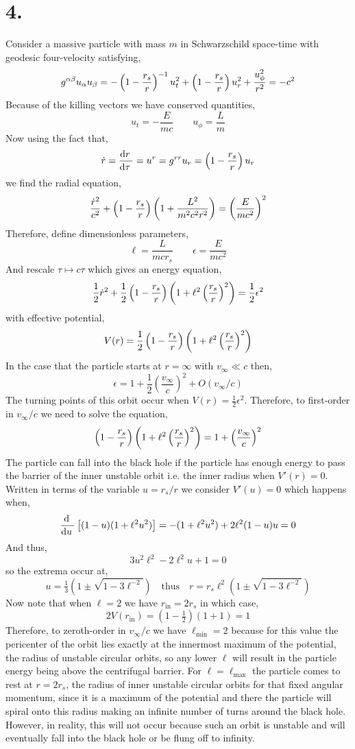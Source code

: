 \documentclass[12pt]{article}
\begin{document}
\section*{4.}

Consider a massive particle with mass $m$ in Schwarzschild space-time with geodesic four-velocity satisfying,
\[ g^{\alpha \beta} u_\alpha u_\beta = - \left( 1 - \frac{r_s}{r} \right)^{-1} u_t^2 + \left( 1 - \frac{r_s}{r} \right) u_r^2 + \frac{u_\phi^2}{r^2} = - c^2 \]
Because of the killing vectors we have conserved quantities, 
\[ u_t = - \frac{E}{mc} \quad \quad u_\phi = \frac{L}{m} \]
Now using the fact that,
\[ \dot{r} = \frac{\mathrm{d}r \:}{\mathrm{d}\tau \:} = u^r = g^{rr} u_r = \left( 1 - \frac{r_s}{r} \right) u_r \]
we find the radial equation,
\[ \frac{\dot{r}^2}{c^2} + \left( 1 - \frac{r_s}{r} \right) \left(1 + \frac{L^2}{m^2 c^2 r^2} \right) = \left( \frac{E}{mc^2} \right)^2  \]
Therefore, define dimensionless parameters,
\[ \ell = \frac{L}{mcr_s} \quad \quad \epsilon = \frac{E}{mc^2} \]
And rescale $\tau \mapsto c \tau$ which gives an energy equation,
\[ \frac{1}{2} \dot{r}^2 + \frac{1}{2} \left( 1 - \frac{r_s}{r} \right) \left(1 + \ell^2 \left( \frac{r_s}{r} \right)^2 \right) = \frac{1}{2} \epsilon^2  \]
with effective potential,
\[ V(r) = \frac{1}{2} \left( 1 - \frac{r_s}{r} \right) \left(1 + \ell^2 \left( \frac{r_s}{r} \right)^2 \right) \]
In the case that the particle starts at $r = \infty$ with $v_\infty \ll c$ then,
\[ \epsilon = 1 + \frac{1}{2} \left( \frac{v_\infty}{c} \right)^2 + O(v_\infty / c) \]
The turning points of this orbit occur when $V(r) = \tfrac{1}{2} \epsilon^2$. Therefore, to first-order in $v_\infty / c$ we need to solve the equation,
\[ \left( 1 - \frac{r_s}{r} \right) \left(1 + \ell^2 \left( \frac{r_s}{r} \right)^2 \right) = 1 + \left( \frac{v_\infty}{c} \right)^2 \]
The particle can fall into the black hole if the particle has enough energy to pass the barrier of the inner unstable orbit i.e. the inner radius when $V'(r) = 0$. Written in terms of the variable $u = r_s / r$ we consider $V'(u) = 0$ which happens when,
\[ \frac{\mathrm{d} \:}{\mathrm{d}u \:} \left[ (1 - u) (1 + \ell^2 u^2) \right] = -(1 + \ell^2 u^2) + 2 \ell^2 (1 - u)u = 0 \]
And thus,
\[ 3 u^2 \ell^2 - 2 \ell^2 u + 1 = 0 \] 
so the extrema occur at,
\[ u = \tfrac{1}{3} (1 \pm \sqrt{1 - 3 \ell^{-2}}) \quad \text{thus} \quad  r = r_s \ell^2 \left( 1 \pm \sqrt{1 - 3 \ell^{-2}} \right) \]
Now note that when $\ell = 2$ we have $r_{\text{in}} = 2 r_s$ in which case,
\[ 2 V(r_{\text{in}}) = (1 - \tfrac{1}{2})(1 + 1) = 1 \]
Therefore, to zeroth-order in $v_\infty / c$ we have $\ell_{\text{min}} = 2$ because for this value the pericenter of the orbit lies exactly at the innermost maximum of the potential, the radius of unstable circular orbits, so any lower $\ell$ will result in the particle energy being above the centrifugal barrier. For $\ell = \ell_{\text{max}}$ the particle comes to rest at $r = 2r_s$, the radius of inner unstable circular orbits for that fixed angular momentum, since it is a maximum of the potential and there the particle will spiral onto this radius making an infinite number of turns around the black hole. However, in reality, this will not occur because such an orbit is unstable and will eventually fall into the black hole or be flung off to infinity. 
\end{document}
